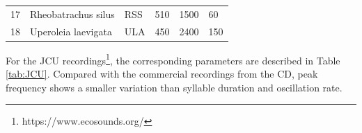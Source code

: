 \begin{table}[htb!]
{\begin{tabular}{llllll}
17        & Rheobatrachus silus           & RSS                & 510                                                                              & 1500                                                                 & 60                                                                               \\ 
18        & Uperoleia laevigata           & ULA                & 450                                                                              & 2400                                                                 & 150                                                                              \\ \hline\hline
\end{tabular}
}
\end{table}


For the JCU recordings\footnote[2]{https://www.ecosounds.org/}, the corresponding parameters are described in Table \ref{tab:JCU}. Compared with the commercial recordings from the CD, peak frequency shows a smaller variation than syllable duration and oscillation rate.


